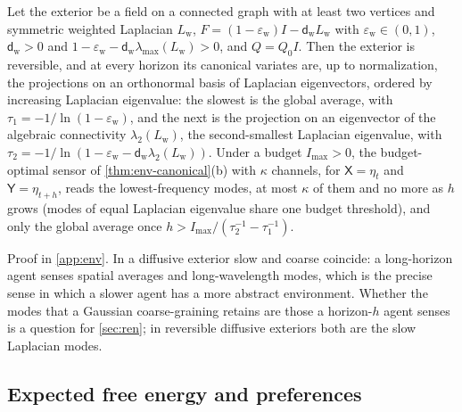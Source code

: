 \begin{proposition}\label{prop:env-diffusive}
Let the exterior be a field on a connected graph with at least two vertices and symmetric weighted Laplacian $L_{\mathrm w}$, $F=(1-\varepsilon_{\mathrm w})I-\mathsf d_{\mathrm w}L_{\mathrm w}$ with $\varepsilon_{\mathrm w}\in(0,1)$, $\mathsf d_{\mathrm w}>0$ and $1-\varepsilon_{\mathrm w}-\mathsf d_{\mathrm w}\lambda_{\max}(L_{\mathrm w})>0$, and $Q=Q_0I$. Then the exterior is reversible, and at every horizon its canonical variates are, up to normalization, the projections on an orthonormal basis of Laplacian eigenvectors, ordered by increasing Laplacian eigenvalue: the slowest is the global average, with $\tau_1=-1/\ln(1-\varepsilon_{\mathrm w})$, and the next is the projection on an eigenvector of the algebraic connectivity $\lambda_2(L_{\mathrm w})$, the second-smallest Laplacian eigenvalue, with $\tau_2=-1/\ln(1-\varepsilon_{\mathrm w}-\mathsf d_{\mathrm w}\lambda_2(L_{\mathrm w}))$. Under a budget $I_{\max}>0$, the budget-optimal sensor of \cref{thm:env-canonical}(b) with $\kappa$ channels, for $\mathsf X=\eta_t$ and $\mathsf Y=\eta_{t+h}$, reads the lowest-frequency modes, at most $\kappa$ of them and no more as $h$ grows (modes of equal Laplacian eigenvalue share one budget threshold), and only the global average once $h>I_{\max}/(\tau_2^{-1}-\tau_1^{-1})$.
\end{proposition}

Proof in \cref{app:env}. In a diffusive exterior slow and coarse coincide: a long-horizon agent senses spatial averages and long-wavelength modes, which is the precise sense in which a slower agent has a more abstract environment. Whether the modes that a Gaussian coarse-graining retains are those a horizon-$h$ agent senses is a question for \cref{sec:ren}; in reversible diffusive exteriors both are the slow Laplacian modes.

\subsection{Expected free energy and preferences}\label{sup:env-expected-free-energy-and-preferences}

